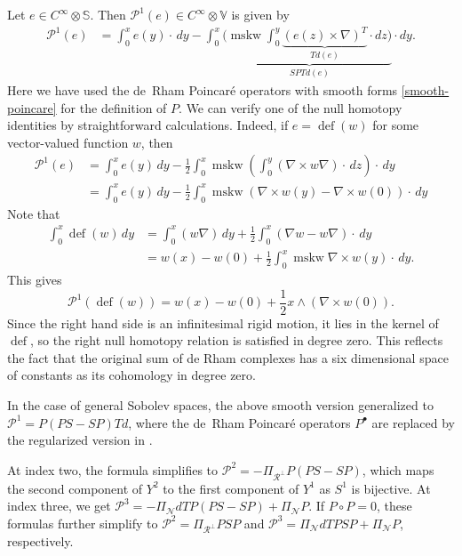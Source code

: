 \documentclass[11pt]{amsart}
\newcommand{\0}{\mathaccent23}
\newcommand\mskw{\operatorname{mskw}}
\newcommand\deff{\operatorname{def}}
\renewcommand\ker{\mathcal{N}}
\newcommand\ran{\mathcal{R}}
\newcommand{\bs}{{\scriptscriptstyle \bullet}}
\begin{document}
  Let $e\in C^{\infty}\otimes \mathbb{S}$. Then $\mathscr{P}^{1}(e)\in C^{\infty}\otimes \mathbb{V}$ is given by 
\begin{align*} 
\mathscr{P}^{1}(e)&=\int_{0}^{x}e(y)\cdot\,dy-\int_{0}^{x}(\underbrace{\mskw\int_{0}^{y}\underbrace{(e({z})\times \nabla)^{T}}_\text{$Td(e)$}\cdot dz)}_\text{$SPTd(e)$}\cdot dy.
\end{align*}
Here we have used the de~Rham Poincar\'e operators with smooth forms \eqref{smooth-poincare} for the definition of $P$. We can verify one of the null homotopy identities by straightforward calculations. Indeed, 
if $e=\deff(w)$ for some vector-valued function $w$, then  
\begin{align*}
\mathscr{P}^{1}(e) &=\int_{0}^{x}e(y)\,dy-\frac{1}{2}\int_{0}^{x}\mskw (\int_{0}^{y}(\nabla\times w\nabla)\cdot\,dz)\cdot\, dy\\
&=\int_{0}^{x}e(y)\,dy-\frac{1}{2}\int_{0}^{x}\mskw (\nabla\times w(y) -\nabla\times w(0)) \cdot\, dy
\end{align*}
Note that 
\begin{align*}
\int_{0}^{x}\deff(w)\,dy&=\int_{0}^{x}(w\nabla)\,dy+\frac{1}{2}\int_{0}^{x}(\nabla w-w\nabla)\cdot\,dy\\
&=w(x)-w(0)+\frac{1}{2}\int_{0}^{x}\mskw \nabla\times w (y)\cdot\, dy.
\end{align*}
This gives 
$$
\mathscr{P}^{1}(\deff(w))=w(x)-w(0)+\frac{1}{2}x\wedge (\nabla\times w(0)).
$$
Since the right hand side is an infinitesimal rigid motion, it lies in the kernel of $\deff$, so the right null homotopy relation is satisfied in degree zero. This reflects the fact that the original sum of de Rham complexes has a six dimensional space of constants as its cohomology in degree zero.

In the case of general Sobolev spaces, the above smooth version generalized to $\mathscr{P}^{1}=P(PS-SP)Td$, where the de~Rham Poincar\'e operators $P^{\bs}$ are replaced by the regularized version in \cite{costabel2010bogovskiui}.
 
 
At index two, the formula simplifies to $\mathscr{P}^{2}=-{\Pi_{\ran^{\perp}}}P(PS-SP)$, which maps the second component of $Y^{2}$ to the first component of $Y^{1}$  as $S^{1}$ is bijective. At index three, we get $\mathscr{P}^{3}=-{\Pi_{\ker}}dTP(PS-SP)+{\Pi_{\ker}}P$. If $P\circ P=0$, these formulas further simplify to $\mathscr{P}^{2}={\Pi_{\ran^{\perp}}}PSP$ and $\mathscr{P}^{3}={\Pi_{\ker}}dTPSP+{\Pi_{\ker}}P$, respectively.
 
\end{document}
